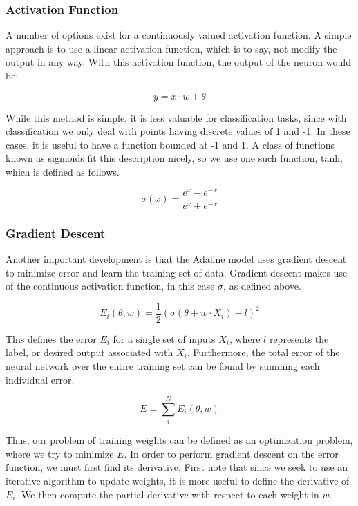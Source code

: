 \documentclass[a4paper, 11pt]{article} %
\begin{document}
\subsubsection*{Activation Function}
A number of options exist for a continuously valued activation function.  A simple approach is to use a linear activation function, which is to say, not modify the output in any way.  With this activation function, the output of the neuron would be:

\begin{equation}
y = x \cdot w + \theta
\end{equation}

While this method is simple, it is less valuable for classification tasks, since with classification we only deal with points having discrete values of 1 and -1.  In these cases, it is useful to have a function bounded at -1 and 1.  A class of functions known as sigmoids fit this description nicely, so we use one such function, tanh, which is defined as follows.

\begin{equation}
\sigma (x) = \frac{e^x - e^{-x}}{e^x + e^{-x}}
\end{equation}

\subsubsection*{Gradient Descent}

Another important development is that the Adaline model uses gradient descent to minimize error and learn the training set of data.  Gradient descent makes use of the continuous activation function, in this case  $\sigma$, as defined above.

\begin{equation}
E_i(\theta ,w) = \frac{1}{2}(\sigma (\theta + w \cdot X_i) - l)^2
\end{equation}

This defines the error $E_i$ for a single set of inputs $X_i$, where $l$ represents the label, or desired output associated with $X_i$.  Furthermore, the total error of the neural network over the entire training set can be found by summing each individual error.

\begin{equation}
E = \sum_{i}^{N} E_i(\theta ,w)
\end{equation}

Thus, our problem of training weights can be defined as an optimization problem, where we try to minimize $E$.  In order to perform gradient descent on the error function, we must first find its derivative.  First note that since we seek to use an iterative algorithm to update weights, it is more useful to define the derivative of $E_i$.  We then compute the partial derivative with respect to each weight in $w$.
\end{document}

